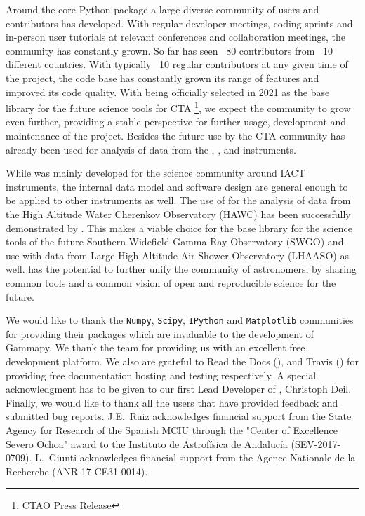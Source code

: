 \documentclass[traditabstract, longauth]{aa}
\begin{document}
Around the core Python package a large diverse community of
users and contributors has developed. With regular developer meetings,
coding sprints and in-person user tutorials at relevant conferences
and collaboration meetings, the community has constantly grown.
So far \gammapy has seen ~80 contributors from ~10 different countries.
With typically ~10 regular contributors at any given time of the
project, the code base has constantly grown its range of features
and improved its code quality. With \gammapy being officially selected
in 2021 as the base library for the future science tools for CTA
\footnote{\href{https://www.cta-observatory.org/ctao-adopts-the-gammapy-software-package-for-science-analysis/}{CTAO Press Release}},
we expect the community to grow
even further, providing a stable perspective for further usage,
development and maintenance of the project. Besides the future use
by the CTA community \gammapy has already
been used for analysis of data from the \hess, \magic, \astri and \veritas instruments.

While \gammapy was mainly developed for the science community around
IACT instruments, the internal data model and software design are general
enough to be applied to other \gammaray instruments as well.
The use of \gammapy for the analysis of data from the High Altitude
Water Cherenkov Observatory (HAWC) has been successfully
demonstrated by \cite{Olivera2022}. This makes \gammapy
a viable choice for the base library for the science tools
of the future Southern Widefield Gamma Ray Observatory
(SWGO) and use with data from Large High Altitude Air Shower Observatory (LHAASO) as well. \gammapy
has the potential to further unify the community
of \gammaray astronomers, by sharing common tools and
a common vision of open and reproducible science for the future.

\begin{acknowledgements}

	We would like to thank the \texttt{Numpy}, \texttt{Scipy}, \texttt{IPython} and
	\texttt{Matplotlib} communities for providing their packages which are
	invaluable to the development of Gammapy. We thank the \github team for
	providing us with an excellent free development platform. We also are grateful
	to Read the Docs (\ReadthedocsUrl), and Travis (\TravisUrl) for providing free
	documentation hosting and testing respectively. Α special acknowledgment has to be given
	to our first Lead Developer of \gammapy, Christoph Deil. Finally, we would like to thank
	all the \gammapy users that have provided feedback and submitted bug reports.
	J.E.~Ruiz acknowledges financial support from the State Agency for Research of
	the Spanish MCIU through the "Center of Excellence Severo Ochoa" award to the
	Instituto de Astrof\'isica de Andaluc\'ia (SEV-2017-0709). L.~Giunti acknowledges
	financial support from the Agence Nationale de la Recherche (ANR-17-CE31-0014).

\end{acknowledgements}




\end{document}
